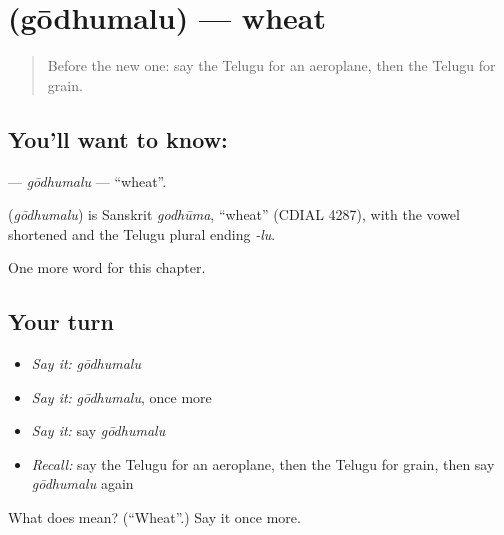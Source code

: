 \section[\texorpdfstring{\te{గోధుమలు} (gōdhumalu)}{గోధుమలు (gōdhumalu)}]{ (gōdhumalu) — wheat}

\label{lesson:TE-C134-godhumalu}



\begin{quote}
Before the new one: say the Telugu for an aeroplane, then the Telugu for grain.
\end{quote}

\subsection*{You'll want to know: }
\textbf{} — \emph{gōdhumalu} — \textquotedblleft{}wheat\textquotedblright{}.

\begin{cousinweb}
\textbf{} (\emph{gōdhumalu}) is Sanskrit \emph{godhūma}, \textquotedblleft{}wheat\textquotedblright{} (CDIAL 4287), with the vowel shortened and the Telugu plural ending \emph{-lu}.
\end{cousinweb}

\begin{grammarlens}[title={What you've built}]
One more word for this chapter.
\end{grammarlens}

\subsection*{Your turn}
\begin{itemize}
\raggedright
  \item \emph{Say it:} \emph{gōdhumalu}
  \item \emph{Say it:} \emph{gōdhumalu}, once more
  \item \emph{Say it:} say \emph{gōdhumalu}
  \item \emph{Recall:} say the Telugu for an aeroplane, then the Telugu for grain, then say \emph{gōdhumalu} again
\end{itemize}

\begin{tcolorbox}[breakable,colback=teal!4,colframe=teal!35!black,title={Before you move on}]
What does  mean? (\textquotedblleft{}Wheat\textquotedblright{}.) Say it once more.
\end{tcolorbox}
